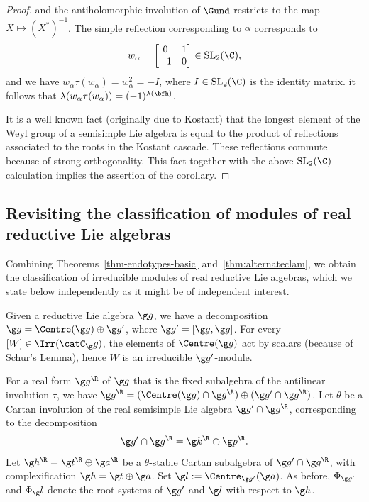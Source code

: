 \documentclass[12pt]{amsart}
\begin{document}
\begin{proof}
and the antiholomorphic involution of $\Gund$ restricts to the map $X\mapsto (X^*)^{-1}$. 
The simple reflection corresponding to $\alpha$ corresponds to 
\begin{equation}
\label{eq:w00}
w_\alpha=\begin{bmatrix}
0 & 1\\-1 & 0
\end{bmatrix}\in\mathrm{SL}_2(\C),
\end{equation}
and we have $w_\alpha\tau(w_\alpha)=w_\alpha^2=-I$, where $I\in\mathrm{SL}_2(\C)$ is the identity matrix. it follows that $\lambda(w_\alpha\tau(w_\alpha))=(-1)^{\lambda(\bfh)}$. 

It is a well known fact (originally due to Kostant) that the longest element of the Weyl group of a semisimple Lie algebra is equal to the product of reflections associated to the roots in the Kostant cascade. These reflections commute because of strong orthogonality. This fact together with the above $\mathrm{SL}_2(\C)$ calculation implies the assertion of the corollary. 
\end{proof}


\subsection{Revisiting the classification of modules  of real reductive Lie algebras}
Combining Theorems~\ref{thm-endotypes-basic} and~\ref{thm:alternateclam}, we obtain the classification of irreducible modules of real reductive Lie algebras, which we state below independently as it might be of independent interest. 

Given a reductive Lie algebra $\g g$, we have a decomposition 
$\g g=\Centre(\g g)\oplus \g g'$, where $\g g'=[\g g,\g g]$. 
For every $[W]\in\Irr(\catC_\g g)$, the elements of $\Centre(\g g)$ act by scalars (because of Schur's Lemma), hence $W$ is an irreducible $\g g'$-module.

For a real form $\g g^\R$ of $\g g$ that is the fixed subalgebra of the antilinear involution $\tau$, we have $\g g^\R=(\Centre(\g g)\cap \g g^\R)\oplus (\g g'\cap \g g^\R)$.  
Let $\theta$ be a Cartan involution of the real semisimple Lie algebra $\g g'\cap \g g^\R$, corresponding to the decomposition  
\[
\g g'\cap \g g^\R=\g k^\R\oplus\g p^\R
.
\] Let $\g h^\R=\g t^\R \oplus\g a^\R$ be a $\theta$-stable Cartan subalgebra of $\g g'\cap \g g^\R$, with complexification $\g h=\g t\oplus\g a$. Set $\g l:=\Centre_{\g g'}(\g a)$.  
As before, 
 $\Phi_{\g g'}$ and $\Phi_\g l$ denote the root systems of  $\g g'$ and $\g l$ with respect to $\g h$.
\end{document}
